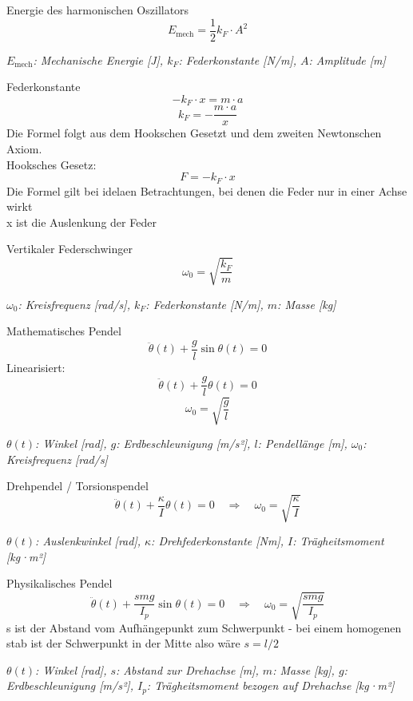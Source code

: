 \documentclass[a4paper,10pt]{article}
\newenvironment{displayformula}
{
	\begin{framed}
		\color{formulaColor}
	}
	{\end{framed}}
\newcommand{\formulalegend}[1]{%
	\par\vspace{0.5ex}%
	{{\color{legendColor}\RaggedRight\small\textit{#1}}}%
	\par\vspace{1.5ex}%
}
\begin{document}
\begin{displayformula}
	Energie des harmonischen Oszillators
	\[
	E_{\text{mech}} = \frac{1}{2} k_F \cdot A^2
	\]
\end{displayformula}
\formulalegend{
	\( E_{\text{mech}} \): Mechanische Energie [J], \( k_F \): Federkonstante [N/m], \( A \): Amplitude [m]
}

\begin{displayformula}
	Federkonstante
	\[
	-k_F \cdot x = m \cdot a
	\]
	\[
	k_F = - \frac{m \cdot a}{x}
	\]
	Die Formel folgt aus dem Hookschen Gesetzt und dem zweiten Newtonschen Axiom. \\ Hooksches Gesetz:
	\[
	F = -k_F \cdot x
	\]
	Die Formel gilt bei idelaen Betrachtungen, bei denen die Feder nur in einer Achse wirkt \\ x ist die Auslenkung der Feder
\end{displayformula}

\begin{displayformula}
	Vertikaler Federschwinger
	\[
	\omega_0 = \sqrt{\frac{k_F}{m}}
	\]
\end{displayformula}
\formulalegend{
	\( \omega_0 \): Kreisfrequenz [rad/s], \( k_F \): Federkonstante [N/m], \( m \): Masse [kg]
}

\begin{displayformula}
	Mathematisches Pendel
	\[
	\ddot{\theta}(t) + \frac{g}{l} \sin\theta(t) = 0
	\]
	Linearisiert:
	\[
	\ddot{\theta}(t) + \frac{g}{l} \theta(t) = 0
	\]
	\[
	\omega_0 = \sqrt{\frac{g}{l}}
	\]
\end{displayformula}
\formulalegend{
	\( \theta(t) \): Winkel [rad], \( g \): Erdbeschleunigung [m/s²], \( l \): Pendellänge [m], \( \omega_0 \): Kreisfrequenz [rad/s]
}

\begin{displayformula}
	Drehpendel / Torsionspendel
	\[
	\ddot{\theta}(t) + \frac{\kappa}{I} \theta(t) = 0
	\quad \Rightarrow \quad \omega_0 = \sqrt{\frac{\kappa}{I}}
	\]
\end{displayformula}
\formulalegend{
	\( \theta(t) \): Auslenkwinkel [rad], \( \kappa \): Drehfederkonstante [Nm], \( I \): Trägheitsmoment [kg·m²]
}

\begin{displayformula}
	Physikalisches Pendel
	\[
	\ddot{\theta}(t) + \frac{s m g}{I_p} \sin\theta(t) = 0
	\quad \Rightarrow \quad \omega_0 = \sqrt{\frac{s m g}{I_p}}
	\]
	s ist der Abstand vom Aufhängepunkt zum Schwerpunkt - bei einem homogenen stab ist der Schwerpunkt in der Mitte also wäre $s = l/2$
\end{displayformula}
\formulalegend{
	\( \theta(t) \): Winkel [rad], \( s \): Abstand zur Drehachse [m], \( m \): Masse [kg], \( g \): Erdbeschleunigung [m/s²], \( I_p \): Trägheitsmoment bezogen auf Drehachse [kg·m²]
}
\end{document}
